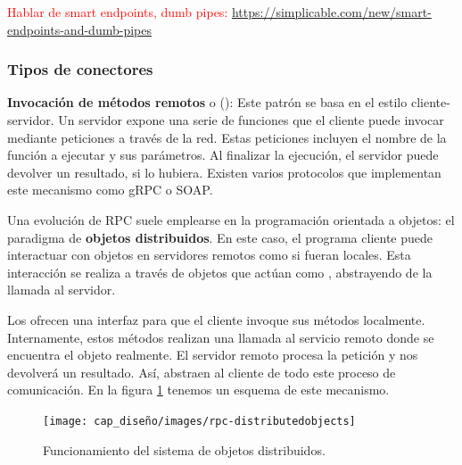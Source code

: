 \textcolor{red}{Hablar de smart endpoints, dumb pipes: \url{https://simplicable.com/new/smart-endpoints-and-dumb-pipes}}

\subsubsection{Tipos de conectores}

\textbf{Invocación de métodos remotos} o (): Este patrón se basa en el estilo cliente-servidor. Un servidor expone una serie de funciones que el cliente puede invocar mediante peticiones a través de la red. Estas peticiones incluyen el nombre de la función a ejecutar y sus parámetros. Al finalizar la ejecución, el servidor puede devolver un resultado, si lo hubiera. Existen varios protocolos que implementan este mecanismo como gRPC o SOAP.

Una evolución de RPC suele emplearse en la programación orientada a objetos: el paradigma de \textbf{objetos distribuidos}. \cite{tanenbaumChapter10Distributed2007} En este caso, el programa cliente puede interactuar con objetos en servidores remotos como si fueran locales. Esta interacción se realiza a través de objetos que actúan como , abstrayendo de la llamada al servidor.

Los  ofrecen una interfaz para que el cliente invoque sus métodos localmente. Internamente, estos métodos realizan una llamada al servicio remoto donde se encuentra el objeto realmente. El servidor remoto procesa la petición y nos devolverá un resultado. Así, abstraen al cliente de todo este proceso de comunicación. En la figura \ref{fig:rpc-distributedobjects} tenemos un esquema de este mecanismo.

\begin{figure}[htb]
  \centering
  \texttt{[image: cap\_diseño/images/rpc-distributedobjects]}
  \caption[Funcionamiento del sistema de objetos distribuidos]{Funcionamiento del sistema de objetos distribuidos. \cite{tanenbaumChapter10Distributed2007}}
  \label{fig:rpc-distributedobjects}
\end{figure}

